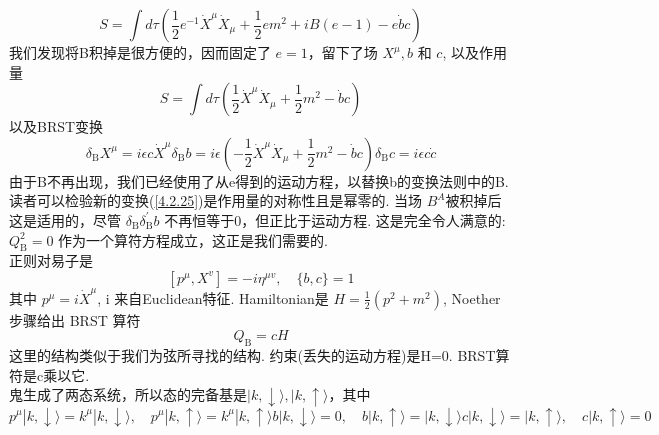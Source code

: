 \begin{equation}
S=\int d \tau\left(\frac{1}{2} e^{-1} \dot{X}^{\mu} \dot{X}_{\mu}+\frac{1}{2} e m^{2}+i B(e-1)-e \dot{b} c\right)
\end{equation}
我们发现将B积掉是很方便的，因而固定了 $e=1 $，留下了场 $X^{\mu}, b$ 和 $c$, 以及作用量
\begin{equation}
S=\int d \tau\left(\frac{1}{2} \dot{X}^{\mu} \dot{X}_{\mu}+\frac{1}{2} m^{2}-\dot{b} c\right)
\end{equation}
以及BRST变换
\begin{subequations}\label{4.2.25}
\begin{equation}
\delta_{\mathrm{B}} X^{\mu}=i \epsilon c \dot{X}^{\mu}
\end{equation}
\begin{equation}
\delta_{\mathrm{B}} b=i \epsilon\left(-\frac{1}{2} \dot{X}^{\mu} \dot{X}_{\mu}+\frac{1}{2} m^{2}-\dot{b} c\right)
\end{equation}
\begin{equation}
\delta_{\mathrm{B}} c=i \epsilon c \dot{c}
\end{equation}
\end{subequations}
由于B不再出现，我们已经使用了从e得到的运动方程，以替换b的变换法则中的B. 读者可以检验新的变换(\ref{4.2.25})是作用量的对称性且是幂零的. 当场 $B^{A}$被积掉后这是适用的，尽管 $\delta_{\mathrm{B}} \delta_{\mathrm{B}}^{\prime} b$ 不再恒等于0，但正比于运动方程. 这是完全令人满意的: $Q_{\mathrm{B}}^{2}=0$ 作为一个算符方程成立，这正是我们需要的.\\
正则对易子是
\begin{equation}
\left[p^{\mu}, X^{v}\right]=-i \eta^{\mu v}, \quad\{b, c\}=1
\end{equation}
其中 $p^{\mu}=i \dot{X}^{\mu}$, i 来自Euclidean特征. Hamiltonian是 $H=\frac{1}{2}\left(p^{2}+m^{2}\right)$,  Noether步骤给出 BRST 算符
\begin{equation}
Q_{\mathrm{B}}=c H
\end{equation}
这里的结构类似于我们为弦所寻找的结构. 约束(丢失的运动方程)是H=0. BRST算符是c乘以它.\\
鬼生成了两态系统，所以态的完备基是$|k, \downarrow\rangle,|k, \uparrow\rangle$，其中
\begin{subequations}
\begin{equation}
p^{\mu}|k, \downarrow\rangle=k^{\mu}|k, \downarrow\rangle, \quad p^{\mu}|k, \uparrow\rangle=k^{\mu}|k, \uparrow\rangle
\end{equation}
\begin{equation}
b|k, \downarrow\rangle=0, \quad b|k, \uparrow\rangle=|k, \downarrow\rangle
\end{equation}
\begin{equation}
c|k, \downarrow\rangle=|k, \uparrow\rangle, \quad c|k, \uparrow\rangle=0
\end{equation}
\end{subequations}
